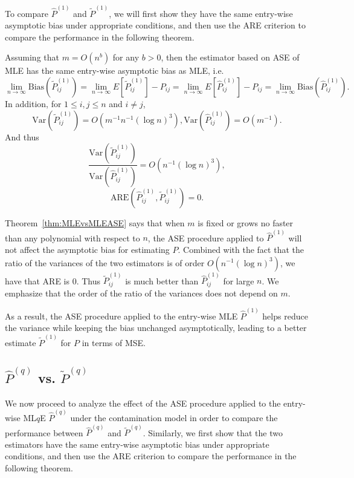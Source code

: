 To compare $\hat{P}^{(1)}$ and $\widetilde{P}^{(1)}$, we will first show they have the same entry-wise asymptotic bias under appropriate conditions, and then use the ARE criterion to compare the performance in the following theorem.

\begin{theorem}
\label{thm:MLEvsMLEASE}
Assuming that $m = O(n^b)$ for any $b > 0$, then the estimator based on ASE of MLE has the same entry-wise asymptotic bias as MLE, i.e.\
\[
	\lim_{n \to \infty} \mathrm{Bias}(\widetilde{P}_{ij}^{(1)}) = \lim_{n \to \infty} E[\widetilde{P}_{ij}^{(1)}] - P_{ij} = \lim_{n \to \infty} E[\hat{P}^{(1)}_{ij}] - P_{ij}
    = \lim_{n \to \infty} \mathrm{Bias}(\hat{P}_{ij}^{(1)}).
\]
In addition, for $1 \le i, j \le n$ and $i \ne j$,
\[
	\mathrm{Var}(\widetilde{P}_{ij}^{(1)}) = O(m^{-1} n^{-1} (\log n)^3),
	\mathrm{Var}(\hat{P}_{ij}^{(1)}) = O(m^{-1}).
\]
And thus
\[
	\frac{\mathrm{Var}(\widetilde{P}_{ij}^{(1)})}{\mathrm{Var}(\hat{P}_{ij}^{(1)})}
    = O(n^{-1} (\log n)^3),
\]
\[
	\mathrm{ARE}(\hat{P}_{ij}^{(1)}, \widetilde{P}_{ij}^{(1)}) = 0.
\]
\end{theorem}

Theorem~\ref{thm:MLEvsMLEASE} says that when %
$m$ is fixed or grows no faster than any polynomial with respect to $n$, the ASE procedure applied to $\hat{P}^{(1)}$ will not affect the asymptotic bias for estimating $P$.
Combined with the fact that the ratio of the variances of the two estimators is of order $O(n^{-1} (\log n)^3)$, we have that ARE is 0.
Thus $\widetilde{P}_{ij}^{(1)}$ is much better than $\hat{P}_{ij}^{(1)}$ for large $n$. We emphasize that the order of the ratio of the variances does not depend on $m$.

As a result, the ASE procedure applied to the entry-wise MLE $\hat{P}^{(1)}$ helps reduce the variance while keeping the bias unchanged asymptotically, leading to a better estimate $\widetilde{P}^{(1)}$ for $P$ in terms of MSE.




\subsection[MLqE vs. ASE of MLqE]{$\hat{P}^{(q)}$ vs. $\widetilde{P}^{(q)}$}

We now proceed to analyze the effect of the ASE procedure applied to the entry-wise ML$q$E $\hat{P}^{(q)}$ under the contamination model in order to compare the performance between $\hat{P}^{(q)}$ and $\widetilde{P}^{(q)}$. Similarly, we first show that the two estimators have the same entry-wise asymptotic bias under appropriate conditions, and then use the ARE criterion to compare the performance in the following theorem.

